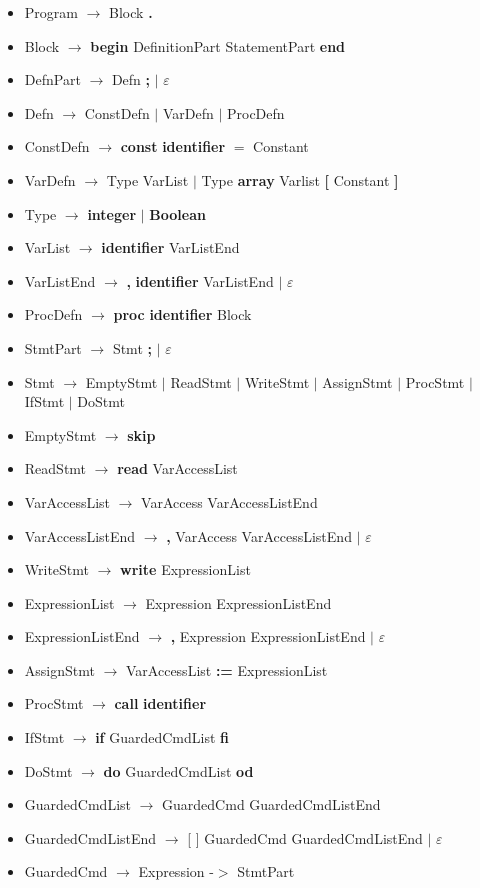 \documentclass{article}
\let\bf\textbf
\newcommand{\der}{$\longrightarrow$ }
\newcommand{\es}{$\varepsilon$ }
\newcommand{\alt}{\Large$|$ \normalsize }
\begin{document}
\begin{itemize}[label={}]
    \item Program \der Block \bf .
    \item Block \der \bf{begin} DefinitionPart StatementPart \bf{end}
    \item DefnPart \der Defn \bf ; \alt \es
    \item Defn \der ConstDefn \alt VarDefn \alt ProcDefn
    \item ConstDefn \der \bf{const} \bf{identifier} $=$ Constant
    \item VarDefn \der Type VarList \alt Type \bf{array} Varlist \bf [ Constant \bf ]
    \item Type \der \bf{integer} \alt \bf {Boolean}
    \item VarList \der \bf{identifier} VarListEnd
    \item VarListEnd \der \bf, \bf{identifier} VarListEnd \alt \es
    \item ProcDefn \der \bf{proc} \bf{identifier} Block
    \item StmtPart \der Stmt \bf ; \alt \es
    \item Stmt \der EmptyStmt \alt ReadStmt \alt WriteStmt \alt AssignStmt \alt ProcStmt \alt IfStmt \alt DoStmt
    \item EmptyStmt \der \bf{skip}
    \item ReadStmt \der \bf{read} VarAccessList
    \item VarAccessList \der VarAccess VarAccessListEnd
    \item VarAccessListEnd \der \bf , VarAccess VarAccessListEnd \alt \es
    \item WriteStmt \der \bf{write} ExpressionList
    \item ExpressionList \der Expression ExpressionListEnd
    \item ExpressionListEnd \der \bf, Expression ExpressionListEnd \alt \es 
    \item AssignStmt \der VarAccessList \bf{:=} ExpressionList
    \item ProcStmt \der \bf{call} \bf{identifier}
    \item IfStmt \der \bf{if} GuardedCmdList \bf{fi}
    \item DoStmt \der \bf{do} GuardedCmdList \bf{od}
    \item GuardedCmdList \der GuardedCmd GuardedCmdListEnd
    \item GuardedCmdListEnd \der [ ] GuardedCmd GuardedCmdListEnd \alt \es
    \item GuardedCmd \der Expression -$>$ StmtPart

\end{itemize}
\end{document}
